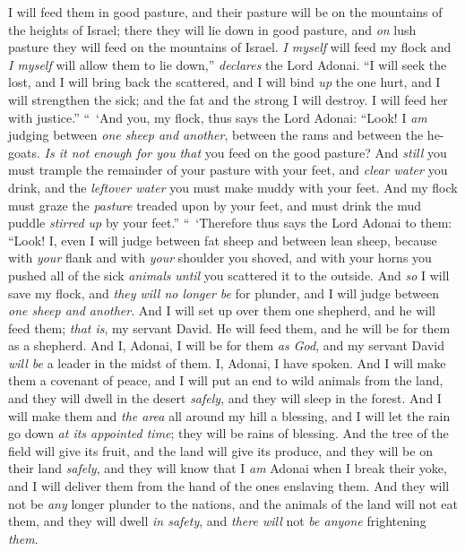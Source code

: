 \begin{biblechapter}
\verse I will feed them in good pasture, and their pasture will be on the mountains of the heights of Israel; there they will lie down in good pasture, and \textit{on} lush pasture they will feed on the mountains of Israel.
\verse \textit{I myself} will feed my flock and \textit{I myself} will allow them to lie down,” \textit{declares} the Lord Adonai.
\verse “I will seek the lost, and I will bring back the scattered, and I will bind \textit{up} the one hurt, and I will strengthen the sick; and the fat and the strong I will destroy. I will feed her with justice.”
\verse “ ‘And you, my flock, thus says the Lord Adonai: “Look! I \textit{am} judging between \textit{one sheep and another}, between the rams and between the he-goats.
\verse \textit{Is it not enough for you} \textit{that} you feed on the good pasture? And \textit{still} you must trample the remainder of your pasture with your feet, and \textit{clear water} you drink, and the \textit{leftover water} you must make muddy with your feet.
\verse And my flock must graze the \textit{pasture} treaded upon by your feet, and must drink the mud puddle \textit{stirred up} by your feet.”
\verse “ ‘Therefore thus says the Lord Adonai to them: “Look! I, even I will judge between fat sheep and between lean sheep,
\verse because with \textit{your} flank and with \textit{your} shoulder you shoved, and with your horns you pushed all of the sick \textit{animals} \textit{until} you scattered it to the outside.
\verse And \textit{so} I will save my flock, and \textit{they will no longer be} for plunder, and I will judge between \textit{one sheep and another}.
\verse And I will set up over them one shepherd, and he will feed them; \textit{that is}, my servant David. He will feed them, and he will be for them as a shepherd.
\verse And I, Adonai, I will be for them \textit{as God}, and my servant David \textit{will be} a leader in the midst of them. I, Adonai, I have spoken.
\verse And I will make them a covenant of peace, and I will put an end to wild animals from the land, and they will dwell in the desert \textit{safely}, and they will sleep in the forest.
\verse And I will make them and \textit{the area} all around my hill a blessing, and I will let the rain go down \textit{at its appointed time}; they will be rains of blessing.
\verse And the tree of the field will give its fruit, and the land will give its produce, and they will be on their land \textit{safely}, and they will know that I \textit{am} Adonai when I break their yoke, and I will deliver them from the hand of the ones enslaving them.
\verse And they will not be \textit{any} longer plunder to the nations, and the animals of the land will not eat them, and they will dwell \textit{in safety}, and \textit{there will} not \textit{be anyone} frightening \textit{them}.

\end{biblechapter}
